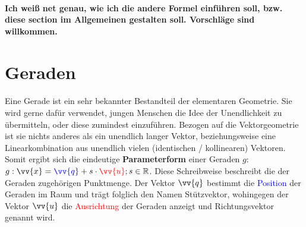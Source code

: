    \paragraph{} \textbf{Ich weiß net genau, wie ich die andere Formel einführen soll, bzw. diese section im Allgemeinen gestalten soll.
     Vorschläge sind willkommen.}

\section{Geraden}

    \paragraph{} Eine Gerade ist ein sehr bekannter Bestandteil der elementaren Geometrie. Sie wird gerne dafür verwendet, jungen Menschen die Idee
    der Unendlichkeit zu übermitteln, oder diese zumindest einzuführen. Bezogen auf die Vektorgeometrie ist sie nichts anderes als ein unendlich
    langer Vektor, beziehungsweise eine Linearkombination aus unendlich vielen (identischen / kollinearen) Vektoren. Somit ergibt sich die eindeutige
    \textbf{Parameterform} einer Geraden $g$: $g:\vv{x}=\textcolor{blue}{\vv{q}}+s\cdot\textcolor{red}{\vv{u}};s\in\R$. Diese Schreibweise beschreibt die der Geraden zugehörigen
    Punktmenge. Der Vektor $\vv{q}$ bestimmt die \textcolor{blue}{Position} der Geraden im Raum und trägt folglich den Namen Stützvektor, wohingegen der Vektor
    $\vv{u}$ die \textcolor{red}{Ausrichtung} der Geraden anzeigt und Richtungsvektor genannt wird.

    \begin{center}
    \end{center}

